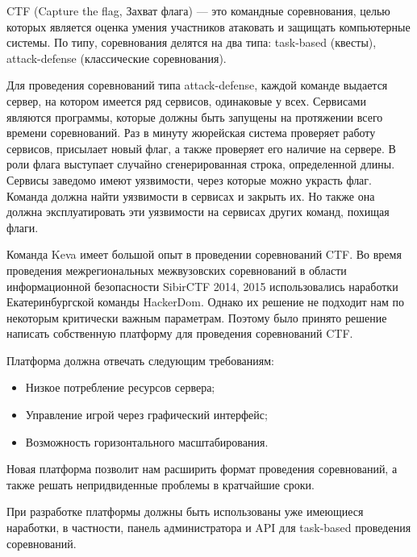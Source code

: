 CTF (Capture the flag, Захват флага) --- это командные соревнования, целью которых является оценка умения участников атаковать и защищать компьютерные системы. По типу, соревнования делятся на два типа: task-based (квесты), attack-defense (классические соревнования).

Для проведения соревнований типа attack-defense, каждой команде выдается сервер, на котором имеется ряд сервисов, одинаковые у всех. Сервисами являются программы, которые должны быть запущены на протяжении всего времени соревнований. Раз в минуту жюрейская система проверяет работу сервисов, присылает новый флаг, а также проверяет его наличие на сервере. В роли флага выступает случайно сгенерированная строка, определенной длины. Сервисы заведомо имеют уязвимости, через которые можно украсть флаг. Команда должна найти уязвимости в сервисах и закрыть их. Но также она должна эксплуатировать эти уязвимости на сервисах других команд, похищая флаги. 

Команда Keva имеет большой опыт в проведении соревнований CTF. Во время проведения межрегиональных межвузовских соревнований в области информационной безопасности SibirCTF 2014, 2015 использовались наработки Екатеринбургской команды HackerDom. Однако их решение не подходит нам по некоторым критически важным параметрам. Поэтому  было принято решение написать собственную платформу для проведения соревнований CTF.

Платформа должна отвечать следующим требованиям:
\begin{itemize}
\item Низкое потребление ресурсов сервера;
\item Управление игрой через графический интерфейс;
\item Возможность горизонтального масштабирования.
\end{itemize}

Новая платформа позволит нам расширить формат проведения соревнований, а также решать непридвиденные проблемы в кратчайшие сроки.

При разработке платформы должны быть использованы уже имеющиеся наработки, в частности, панель администратора и API для task-based проведения соревнований. 

